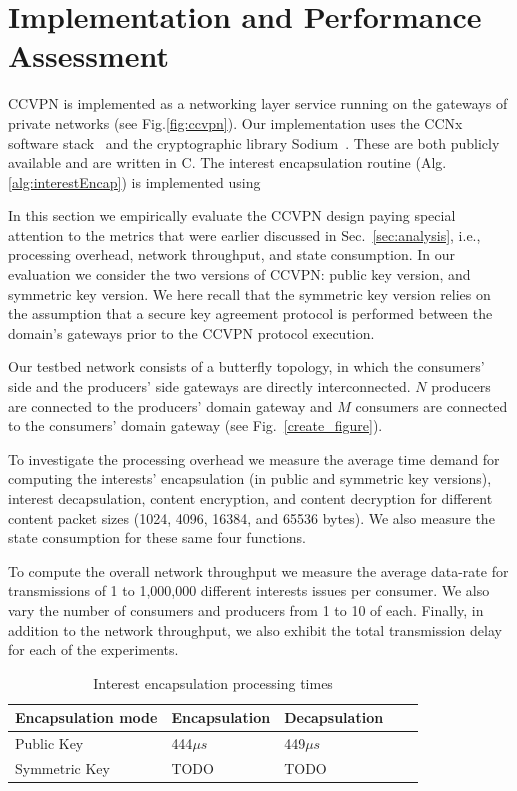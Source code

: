 \section{Implementation and Performance Assessment}


CCVPN is implemented as a networking layer service running on the gateways of private networks (see Fig.\ref{fig:ccvpn}).
Our implementation uses the CCNx software stack~\cite{CCNxGithub} and the cryptographic library Sodium~\cite{sodiumGithub}. These are both publicly available and are written in C.
The interest encapsulation routine (Alg.\ref{alg:interestEncap}) is implemented using 

In this section we empirically evaluate the CCVPN design paying special attention to the metrics that were earlier discussed in Sec.~\ref{sec:analysis}, i.e., processing overhead, network throughput, and state consumption. In our evaluation we consider the two versions of CCVPN: public key version, and symmetric key version. We here recall that the symmetric key version relies on the assumption that a secure key agreement protocol is performed between the domain's gateways prior to the CCVPN protocol execution.

Our testbed network consists of a butterfly topology, in which the consumers' side and the producers' side gateways are directly interconnected. $N$ producers are connected to the producers' domain gateway and $M$ consumers are connected to the consumers' domain gateway (see Fig.~\ref{create_figure}).

To investigate the processing overhead we measure the average time demand for computing the interests' encapsulation (in public and symmetric key versions), interest decapsulation, content encryption, and content decryption for different content packet sizes (1024, 4096, 16384, and 65536 bytes). We also measure the state consumption for these same four functions.

To compute the overall network throughput we measure the average data-rate for transmissions of 1 to 1,000,000 different interests issues per consumer. We also vary the number of consumers and producers from 1 to 10 of each. Finally, in addition to the network throughput, we also exhibit the total transmission delay for each of the experiments.


\begin{table}[!h]
\centering
\caption{Interest encapsulation processing times}
\label{my-label}
\begin{tabular}{|l|l|l|l|l|}
\hline
Encapsulation mode   & Encapsulation & Decapsulation \\ \hline
Public Key  & 444$\mu s$           & 449$\mu s$           \\ \hline \cline{4-5} 
Symmetric Key & TODO          & TODO          \\ \hline
\end{tabular}
\end{table}



